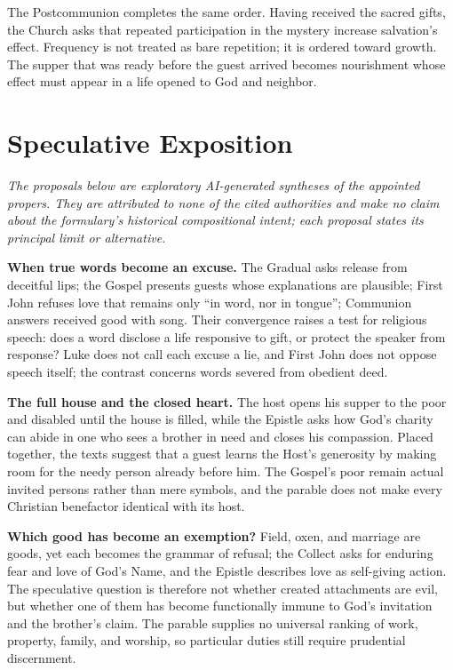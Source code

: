 \begin{deepstudy}
The Postcommunion completes the same order. Having received the sacred gifts, the Church asks that repeated participation in the mystery increase salvation's effect. Frequency is not treated as bare repetition; it is ordered toward growth. The supper that was ready before the guest arrived becomes nourishment whose effect must appear in a life opened to God and neighbor.

\section*{Speculative Exposition}

\noindent\emph{The proposals below are exploratory AI-generated syntheses of the appointed propers. They are attributed to none of the cited authorities and make no claim about the formulary's historical compositional intent; each proposal states its principal limit or alternative.}

\noindent\textbf{When true words become an excuse.\enspace{}}
The Gradual asks release from deceitful lips; the Gospel presents guests whose explanations are plausible; First John refuses love that remains only ``in word, nor in tongue''; Communion answers received good with song. Their convergence raises a test for religious speech: does a word disclose a life responsive to gift, or protect the speaker from response? Luke does not call each excuse a lie, and First John does not oppose speech itself; the contrast concerns words severed from obedient deed.

\noindent\textbf{The full house and the closed heart.\enspace{}}
The host opens his supper to the poor and disabled until the house is filled, while the Epistle asks how God's charity can abide in one who sees a brother in need and closes his compassion. Placed together, the texts suggest that a guest learns the Host's generosity by making room for the needy person already before him. The Gospel's poor remain actual invited persons rather than mere symbols, and the parable does not make every Christian benefactor identical with its host.

\noindent\textbf{Which good has become an exemption?\enspace{}}
Field, oxen, and marriage are goods, yet each becomes the grammar of refusal; the Collect asks for enduring fear and love of God's Name, and the Epistle describes love as self-giving action. The speculative question is therefore not whether created attachments are evil, but whether one of them has become functionally immune to God's invitation and the brother's claim. The parable supplies no universal ranking of work, property, family, and worship, so particular duties still require prudential discernment.


\end{deepstudy}
